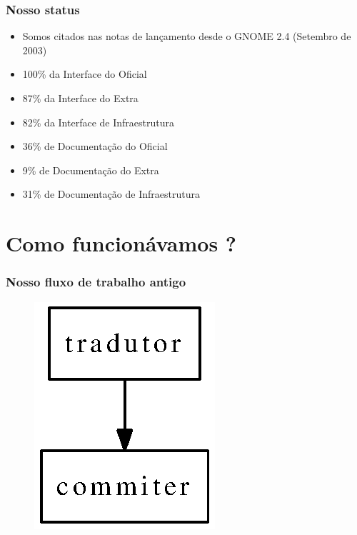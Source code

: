 \documentclass{beamer}
\begin{document}
\begin{frame}
    \frametitle[Para o GNOME 2.28]{Nosso status}    
    \begin{itemize}[<+->]
        \item \color[rgb]{0,1,0}   Somos citados nas notas de lançamento desde o GNOME 2.4 (Setembro de 2003)  
        \item \color[rgb]{0,1,0}  100\% da Interface do Oficial 
        \item \color[rgb]{0,1,0}  87\% da Interface do Extra
        \item \color[rgb]{0,1,0}  82\% da Interface de Infraestrutura
        \item \color[rgb]{1,0,0} 36\% de Documentação do Oficial
        \item \color[rgb]{1,0,0} 9\%  de Documentação do Extra
        \item \color[rgb]{1,0,0} 31\% de Documentação de Infraestrutura
    \end{itemize}

\end{frame}

\section{Como funcionávamos ?}

\begin{frame}
    \frametitle{Nosso fluxo de trabalho antigo}
    \begin{figure}[ht]
        \includegraphics{fluxo_antigo.eps}     
    \end{figure}
\end{frame}
\end{document}

